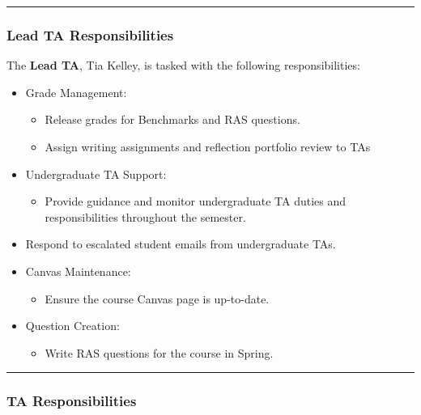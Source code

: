 \documentclass[
]{article}
\providecommand{\tightlist}{%
  \setlength{\itemsep}{0pt}\setlength{\parskip}{0pt}}
\begin{document}
\begin{center}\rule{0.5\linewidth}{0.5pt}\end{center}

\hypertarget{lead-ta-responsibilities}{%
\subsubsection{Lead TA Responsibilities}\label{lead-ta-responsibilities}}

The \textbf{Lead TA}, Tia Kelley, is tasked with the following responsibilities:

\begin{itemize}
\tightlist
\item
  Grade Management:

  \begin{itemize}
  \tightlist
  \item
    Release grades for Benchmarks and RAS questions.
  \item
    Assign writing assignments and reflection portfolio review to TAs
  \end{itemize}
\item
  Undergraduate TA Support:

  \begin{itemize}
  \tightlist
  \item
    Provide guidance and monitor undergraduate TA duties and responsibilities throughout the semester.
  \end{itemize}
\item
  Respond to escalated student emails from undergraduate TAs.
\item
  Canvas Maintenance:

  \begin{itemize}
  \tightlist
  \item
    Ensure the course Canvas page is up-to-date.
  \end{itemize}
\item
  Question Creation:

  \begin{itemize}
  \tightlist
  \item
    Write RAS questions for the course in Spring.
  \end{itemize}
\end{itemize}

\begin{center}\rule{0.5\linewidth}{0.5pt}\end{center}

\hypertarget{ta-responsibilities}{%
\subsubsection{TA Responsibilities}\label{ta-responsibilities}}
\end{document}
